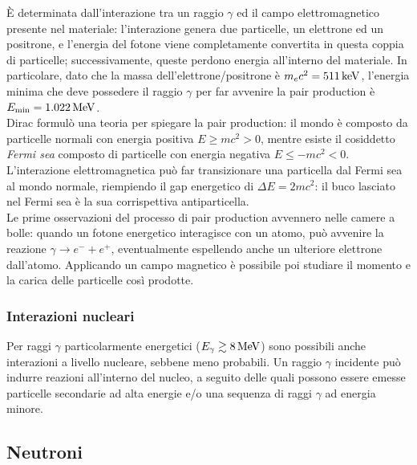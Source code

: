 È determinata dall'interazione tra un raggio $ \gamma $ ed il campo elettromagnetico presente nel materiale: l'interazione genera due particelle, un elettrone ed un positrone, e l'energia del fotone viene completamente convertita in questa coppia di particelle; successivamente, queste perdono energia all'interno del materiale. In particolare, dato che la massa dell'elettrone/positrone è $ m_ec^2 = 511\,\mathrm{keV} $, l'energia minima che deve possedere il raggio $ \gamma $ per far avvenire la pair production è $ E_{\text{min}} = 1.022\,\mathrm{MeV} $.\\
Dirac formulò una teoria per spiegare la pair production: il mondo è composto da particelle normali con energia positiva $ E \ge m c^2 > 0 $, mentre esiste il cosiddetto \textit{Fermi sea} composto di particelle con energia negativa $ E \le - m c^2 < 0 $. L'interazione elettromagnetica può far transizionare una particella dal Fermi sea al mondo normale, riempiendo il gap energetico di $ \Delta E = 2mc^2 $: il buco lasciato nel Fermi sea è la sua corrispettiva antiparticella.\\
Le prime osservazioni del processo di pair production avvennero nelle camere a bolle: quando un fotone energetico interagisce con un atomo, può avvenire la reazione $ \gamma \rightarrow e^- + e^+ $, eventualmente espellendo anche un ulteriore elettrone dall'atomo. Applicando un campo magnetico è possibile poi studiare il momento e la carica delle particelle così prodotte.

\subsubsection{Interazioni nucleari}

Per raggi $ \gamma $ particolarmente energetici ($ E_{\gamma} \gtrsim 8\,\mathrm{MeV} $) sono possibili anche interazioni a livello nucleare, sebbene meno probabili. Un raggio $ \gamma $ incidente può indurre reazioni all'interno del nucleo, a seguito delle quali possono essere emesse particelle secondarie ad alta energie e/o una sequenza di raggi $ \gamma $ ad energia minore.

\subsection{Neutroni}

